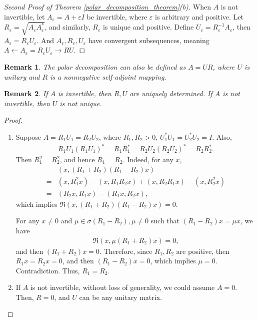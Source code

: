 \documentclass[11pt]{book}
\newtheorem{remark}{Remark}[chapter]
\theoremstyle{definition}
\numberwithin{equation}{chapter}
\begin{document}
\medskip

\begin{proof}[Second Proof of Theorem \ref{polar_decomposition_theorem}(b)]
When $A$ is not invertible, let $A_\varepsilon = A + \varepsilon I$ be invertible, where $\varepsilon$ is arbitrary and positive. Let $R_\varepsilon = \sqrt{A_\varepsilon A_\varepsilon^*}$, and similarly, $R_\varepsilon$ is unique and positive. Define $U_\varepsilon = R_\varepsilon^{-1} A_\varepsilon$, then $A_\varepsilon = R_\varepsilon U_\varepsilon$. And $A_\varepsilon, R_\varepsilon, U_\varepsilon$ have convergent subsequences, meaning $A \gets A_\varepsilon = R_\varepsilon U_\varepsilon \to RU$.
\end{proof}

\medskip

\begin{remark}
The polar decomposition can also be defined as $A = UR$, where $U$ is unitary and $R$ is a nonnegative self-adjoint mapping.
\end{remark}

\medskip

\begin{remark}
If $A$ is invertible, then $R, U$ are uniquely determined. If $A$ is not invertible, then $U$ is not unique.
\end{remark}
\begin{proof}
~\begin{enumerate}[label=(\alph*)]
    \item Suppose $A = R_1U_1 = R_2 U_2$, where $R_1, R_2 > 0$, $U_1^* U_1 = U_2^* U_2 = I$. Also,
    \begin{align*}
        R_1 U_1 \left(R_1 U_1\right)^* = R_1 R_1^* = R_2 U_2 \left(R_2 U_2\right)^* = R_2 R_2^*.
    \end{align*}
    Then $R_1^2 = R_2^2$, and hence $R_1 = R_2$. Indeed, for any $x$, 
    \begin{align*}
        & \left(x, (R_1 + R_2)(R_1 - R_2)x\right) \\
        = & (x, R_1^2x) - (x, R_1 R_2 x) + (x, R_2 R_1 x) - (x, R_2^2x) \\
        = & (R_2 x, R_1 x) - (R_1 x, R_2 x),
    \end{align*}
    which implies $\Re\left(x, (R_1 + R_2)(R_1 - R_2)x\right) = 0$. 
    
    For any $x \neq 0$ and $\mu \in \sigma(R_1 - R_2), \mu \neq 0$ such that $(R_1 - R_2)x = \mu x$, we have
    \begin{align*}
        \Re\left(x, \mu (R_1 + R_2) x\right) = 0,
    \end{align*}
    and then $(R_1 + R_2) x = 0$. Therefore, since $R_1, R_2$ are positive, then $R_1 x = R_2 x = 0$, and then $(R_1 - R_2)x = 0$, which implies $\mu = 0$. Contradiction. Thus, $R_1 = R_2$.
    
    \item If $A$ is not invertible, without loss of generality, we could assume $A = 0$. Then, $R = 0$, and $U$ can be any unitary matrix.
\end{enumerate}
\end{proof}
\end{document}
